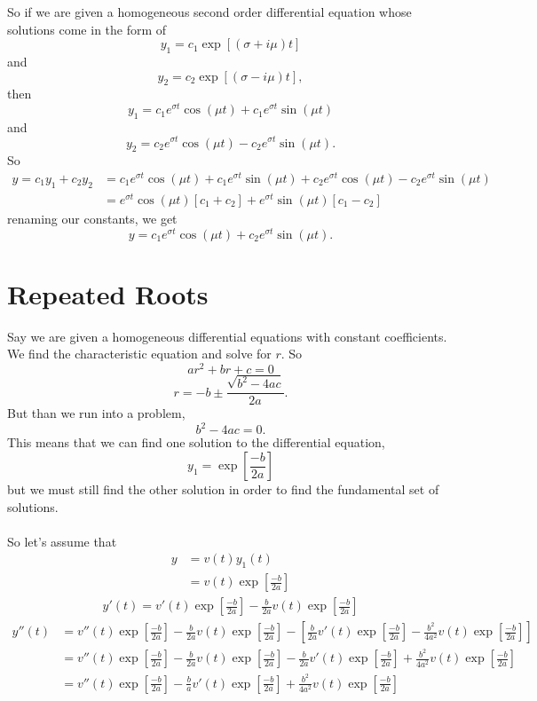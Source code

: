 \documentclass[font =22]{report}
\begin{document}
So if we are given a homogeneous second order differential equation whose solutions come in the form of 
\[
y_1 = c_1\exp[(\sigma + i \mu) t]
\]
and 
\[
y_2 = c_2\exp[(\sigma - i \mu) t],
\]
then
\[
y_1 = c_1e^{\sigma t}\cos(\mu t) + c_1e^{\sigma t}\sin(\mu t)
\]
and 
\[
y_2 = c_2e^{\sigma t}\cos(\mu t) - c_2e^{\sigma t}\sin(\mu t).
\]
So 
\begin{align*}
y = c_1y_1 + c_2y_2 &= c_1e^{\sigma t}\cos(\mu t) + c_1e^{\sigma t}\sin(\mu t) + c_2e^{\sigma t}\cos(\mu t) - c_2e^{\sigma t}\sin(\mu t)\\
&= e^{\sigma t}\cos(\mu t)[c_1+c_2]+ e^{\sigma t}\sin(\mu t)[c_1-c_2]
\end{align*}
renaming our constants, we get
\[
y = c_1e^{\sigma t}\cos(\mu t)+ c_2e^{\sigma t}\sin(\mu t).
\]




\section{Repeated Roots}

Say we are given a homogeneous differential equations with constant coefficients. We find the characteristic equation and solve for $r$. So
\[
ar^2+br + c = 0
\]
\[
r = -b \pm \frac{\sqrt{b^2-4ac}}{2a}.
\]
But than we run into a problem, 
\[
b^2-4ac=0.
\]
This means that we can find one solution to the differential equation,
\[
y_1= \exp\left[\frac{-b}{2a}\right]
\]
but we must still find the other solution in order to find the fundamental set of solutions.
\paragraph{}
So let's assume that 
\begin{align*}
y &= v(t)y_1(t)\\
&= v(t)\exp\left[\frac{-b}{2a}\right]
\end{align*}
\begin{align*}
y'(t) = v'(t)\exp\left[\frac{-b}{2a}\right] -\frac{b}{2a}v(t)\exp\left[\frac{-b}{2a}\right]
\end{align*}
\begin{align*}
y''(t) &= v''(t)\exp\left[\frac{-b}{2a}\right] -\frac{b}{2a}v(t)\exp\left[\frac{-b}{2a}\right] - \left[ \frac{b}{2a}v'(t)\exp\left[\frac{-b}{2a}\right] -\frac{b^2}{4a^2}v(t)\exp\left[\frac{-b}{2a}\right]  \right]\\
&=  v''(t)\exp\left[\frac{-b}{2a}\right] -\frac{b}{2a}v(t)\exp\left[\frac{-b}{2a}\right] -  \frac{b}{2a}v'(t)\exp\left[\frac{-b}{2a}\right] +\frac{b^2}{4a^2}v(t)\exp\left[\frac{-b}{2a}\right]\\
&=  v''(t)\exp\left[\frac{-b}{2a}\right] -\frac{b}{a}v'(t)\exp\left[\frac{-b}{2a}\right]  +\frac{b^2}{4a^2}v(t)\exp\left[\frac{-b}{2a}\right]  
\end{align*}
\end{document}
